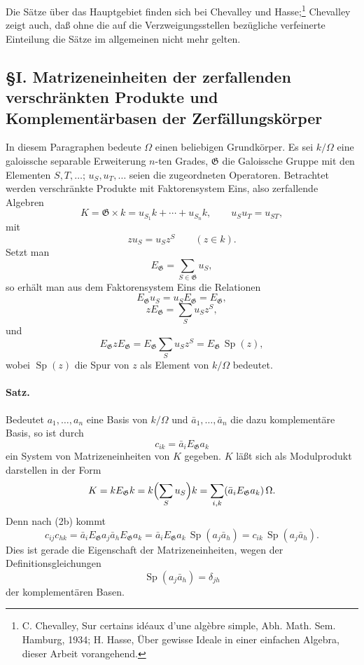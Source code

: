 \documentclass[11pt]{article}
\providecommand{\Sp}{\operatorname{Sp}}
\providecommand{\Gg}{\mathfrak G}
\begin{document}
Die Sätze über das Hauptgebiet finden sich bei Chevalley und Hasse;\footnote{C. Chevalley, Sur certains idéaux d'une algèbre simple, Abh. Math. Sem. Hamburg, 1934; H. Hasse, Über gewisse Ideale in einer einfachen Algebra, dieser Arbeit vorangehend.} Chevalley zeigt auch, daß ohne die auf die Verzweigungsstellen bezügliche verfeinerte Einteilung die Sätze im allgemeinen nicht mehr gelten.

\subsection*{§I. Matrizeneinheiten der zerfallenden verschränkten Produkte und Komplementärbasen der Zerfällungskörper}

In diesem Paragraphen bedeute \(\Omega\) einen beliebigen Grundkörper. Es sei \(k/\Omega\) eine galoissche separable Erweiterung \(n\)-ten Grades, \(\Gg\) die Galoissche Gruppe mit den Elementen \(S,T,\ldots\); \(u_S,u_T,\ldots\) seien die zugeordneten Operatoren. Betrachtet werden verschränkte Produkte mit Faktorensystem Eins, also zerfallende Algebren
\[
        K=\Gg\times k=u_{S_1}k+\cdots+u_{S_n}k,\qquad
        u_Su_T=u_{ST},
\]
mit
\[
        z u_S=u_S z^S \qquad(z\in k).
\]
Setzt man
\[
        E_\Gg=\sum_{S\in\Gg}u_S,
\]
so erhält man aus dem Faktorensystem Eins die Relationen
\[
        E_\Gg u_S=u_S E_\Gg=E_\Gg,                            \tag{1}
\]
\[
        zE_\Gg=\sum_Su_Sz^S,                                  \tag{2a}
\]
und
\[
        E_\Gg z E_\Gg
        =E_\Gg\sum_Su_Sz^S
        =E_\Gg\,\Sp(z),                                      \tag{2b}
\]
wobei \(\Sp(z)\) die Spur von \(z\) als Element von \(k/\Omega\) bedeutet.

\paragraph{Satz.}
Bedeutet \(a_1,\ldots,a_n\) eine Basis von \(k/\Omega\) und \(\bar a_1,\ldots,\bar a_n\) die dazu komplementäre Basis, so ist durch
\[
        c_{ik}=\bar a_iE_\Gg a_k
\]
ein System von Matrizeneinheiten von \(K\) gegeben. \(K\) läßt sich als Modulprodukt darstellen in der Form
\[
        K=kE_\Gg k
          =k\Bigl(\sum_Su_S\Bigr)k
          =\sum_{i,k}(\bar a_iE_\Gg a_k)\,\Omega .
\]
Denn nach (2b) kommt
\[
        c_{ij}c_{hk}
        =\bar a_iE_\Gg a_j\bar a_hE_\Gg a_k
        =\bar a_iE_\Gg a_k\,\Sp(a_j\bar a_h)
        =c_{ik}\,\Sp(a_j\bar a_h).
\]
Dies ist gerade die Eigenschaft der Matrizeneinheiten, wegen der Definitionsgleichungen
\[
        \Sp(a_j\bar a_h)=\delta_{jh}
\]
der komplementären Basen.
\end{document}
